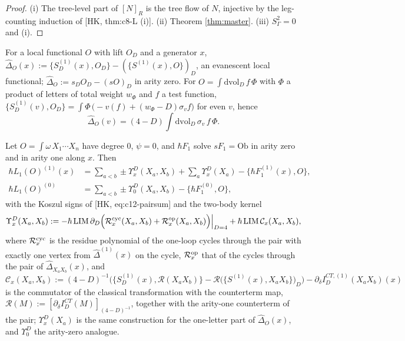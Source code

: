 \begin{proof}
(i) The tree-level part of $[N]_R$ is the tree flow of $N$, injective by the leg-counting induction of [HK, thm:c8-L (i)]. (ii) Theorem \ref{thm:master}. (iii) $S_\Gamma^2=0$ and (i).
\end{proof}

\begin{definition}
\label{def:opbreak}
For a local functional $O$ with lift $O_D$ and a generator $x$, $\widehat\Delta_O(x):=\{S^{(1)}_D(x),O_D\}-(\{S^{(1)}(x),O\})_D$, an evanescent local functional; $\widehat\Delta_O:=s_DO_D-(sO)_D$ in arity zero. For $O=\int\mathrm{dvol}_D\,f\,\Phi$ with $\Phi$ a product of letters of total weight $w_\Phi$ and $f$ a test function, $\{S^{(1)}_D(v),O_D\}=\int\Phi\,\big(-v(f)+(w_\Phi-D)\sigma_vf\big)$ for even $v$, hence
\[
\widehat\Delta_O(v)=(4-D)\int\mathrm{dvol}_D\,\sigma_v\,f\,\Phi .
\]
\end{definition}

\begin{theorem}
\label{thm:master}
Let $O=\int\omega\,X_1\cdots X_n$ have degree $0$, $\psi=0$, and $\hbar F_1$ solve $sF_1=\mathrm{Ob}$ in arity zero and in arity one along $x$. Then
\begin{equation}
\begin{aligned}
\hbar L_1(O)^{(1)}(x)&=\sum_{a<b}\pm\Upsilon^D_x(X_a,X_b)+\sum_a\Upsilon^D_x(X_a)-\{\hbar F^{(1)}_1(x),O\},\\
\hbar L_1(O)^{(0)}&=\sum_{a<b}\pm\Upsilon^D_0(X_a,X_b)-\{\hbar F^{(0)}_1,O\},
\end{aligned}
\label{eq:masterD}
\end{equation}
with the Koszul signs of [HK, eq:c12-pairsum] and the two-body kernel
\[
\Upsilon^D_x(X_a,X_b):=-\hbar\,\mathrm{LIM}\,\partial_D\Big(\mathcal R^{\rm cyc}_x(X_a,X_b)+\mathcal R^{\rm op}_x(X_a,X_b)\Big)\Big|_{D=4}+\hbar\,\mathrm{LIM}\,\mathcal C_x(X_a,X_b),
\]
where $\mathcal R^{\rm cyc}_x$ is the residue polynomial of the one-loop cycles through the pair with exactly one vertex from $\widehat\Delta^{(1)}(x)$ on the cycle, $\mathcal R^{\rm op}_x$ that of the cycles through the pair of $\widehat\Delta_{X_aX_b}(x)$, and
\[
\mathcal C_x(X_a,X_b):=(4-D)^{-1}\Big(\big\{S^{(1)}_D(x),\mathcal R(X_aX_b)\big\}-\mathcal R\big(\{S^{(1)}(x),X_aX_b\}\big)_D\Big)-\partial_\delta I^{CT,(1)}_D(X_aX_b)(x)
\]
is the commutator of the classical transformation with the counterterm map, $\mathcal R(M):=[\partial_\delta I^{CT}_D(M)]_{(4-D)^{-1}}$, together with the arity-one counterterm of the pair; $\Upsilon^D_x(X_a)$ is the same construction for the one-letter part of $\widehat\Delta_O(x)$, and $\Upsilon^D_0$ the arity-zero analogue.
\end{theorem}


